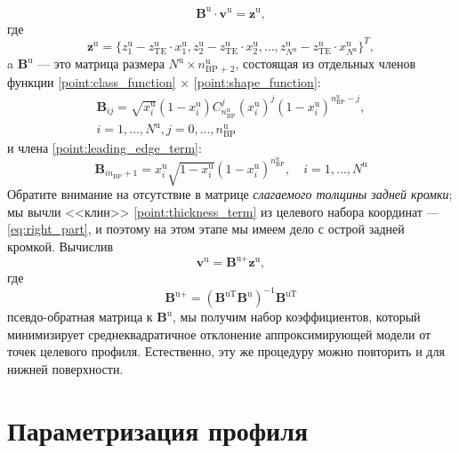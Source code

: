 \begin{equation}\label{eq:CST main LSE}
  \mathbf{B}^\text{u} \cdot \mathbf{v}^\text{u} = \mathbf{z}^\text{u},
\end{equation}
где
\begin{equation} \label{eq:right_part}
  \mathbf{z}^\text{u} = \{z^\text{u}_1 - z^\text{u}_\text{TE} \cdot x^\text{u}_1, z^\text{u}_2 - z^\text{u}_\text{TE} \cdot x^\text{u}_2, \ldots, z^\text{u}_{N^\text{u}} - z^\text{u}_\text{TE} \cdot x^\text{u}_{N^\text{u}}\}^T,
\end{equation}
a $\mathbf{B}^\text{u}$ --- это матрица размера $N^\text{u} \times n^\text{u}_\text{BP + 2}$, состоящая из отдельных членов функции \ref{point:class_function} $\times$ \ref{point:shape_function}:
\begin{gather*}
  \mathbf{B}_{ij} = \sqrt{x^\text{u}_i}(1 - x^\text{u}_i)C^{j}_{n^\text{u}_\text{BP}}(x^\text{u}_i)^{j}(1 - x^\text{u}_i)^{n^\text{u}_\text{BP} - j}, \nonumber \\
  i = 1, ..., N^\text{u}, j = 0, ..., n^\text{u}_\text{BP}
\end{gather*}
и члена \ref{point:leading_edge_term}:
\begin{equation*}
  \mathbf{B}_{in_\text{BP} + 1} = x^\text{u}_i\sqrt{1 - x^\text{u}_i}(1 - x^\text{u}_i)^{n^\text{u}_\text{BP}}, \quad i = 1,..., N^\text{u}
\end{equation*}
Обратите внимание на отсутствие в матрице \textit{слагаемого толщины задней кромки}; мы вычли <<клин>> \ref{point:thickness_term} из целевого набора координат --- \eqref{eq:right_part}, и поэтому на этом этапе мы имеем дело с острой задней кромкой. Вычислив
\begin{equation*}
  \mathbf{v}^\text{u} = \mathbf{B}^\text{u+} \mathbf{z}^\text{u},
\end{equation*}
где
\begin{equation*}
  \mathbf{B}^\text{u+} = (\mathbf{B}^\text{uT} \mathbf{B}^\text{u})^{-1} \mathbf{B}^\text{uT}
\end{equation*}
псевдо-обратная матрица к $\mathbf{B}^\text{u}$, мы получим набор коэффициентов, который минимизирует среднеквадратичное отклонение аппроксимирующей модели от точек целевого профиля. Естественно, эту же процедуру можно повторить и для нижней поверхности.

\section{Параметризация профиля}\label{sect:Airfoil Parametrization}

